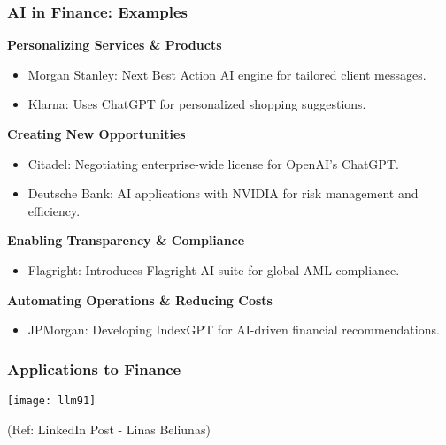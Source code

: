 \begin{frame}[fragile]\frametitle{AI in Finance: Examples}
\textbf{Personalizing Services \& Products}
\begin{itemize}
    \item Morgan Stanley: Next Best Action AI engine for tailored client messages.
    \item Klarna: Uses ChatGPT for personalized shopping suggestions.
\end{itemize}

\textbf{Creating New Opportunities}
\begin{itemize}
    \item Citadel: Negotiating enterprise-wide license for OpenAI's ChatGPT.
    \item Deutsche Bank: AI applications with NVIDIA for risk management and efficiency.
\end{itemize}

\textbf{Enabling Transparency \& Compliance}
\begin{itemize}
    \item Flagright: Introduces Flagright AI suite for global AML compliance.
\end{itemize}

\textbf{Automating Operations \& Reducing Costs}
\begin{itemize}
    \item JPMorgan: Developing IndexGPT for AI-driven financial recommendations.
\end{itemize}
\end{frame}


\begin{frame}[fragile]\frametitle{Applications to Finance}
\begin{center}
\texttt{[image: llm91]}
\end{center}

{\tiny (Ref: LinkedIn Post - Linas Beliunas)}
\end{frame}
